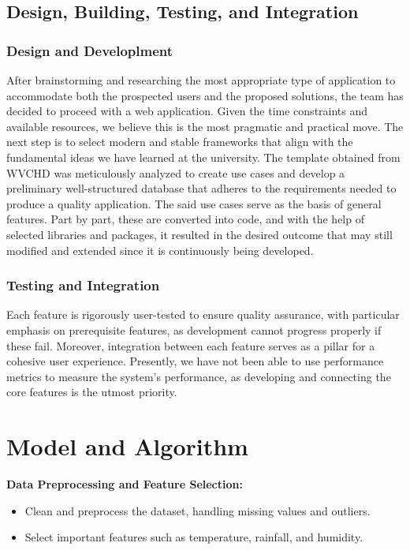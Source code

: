 \subsection{Design, Building, Testing, and Integration}
\subsubsection{Design and Developlment}
After brainstorming and researching the most appropriate type of application to accommodate both the prospected users and the proposed solutions, the team has decided to proceed with a web application. Given the time constraints and available resources, we believe this is the most pragmatic and practical move. The next step is to select modern and stable frameworks that align with the fundamental ideas we have learned at the university. The template obtained from WVCHD was meticulously analyzed to create use cases and develop a preliminary well-structured database that adheres to the requirements needed to produce a quality application. The said use cases serve as the basis of general features. Part by part, these are converted into code, and with the help of selected libraries and packages, it resulted in the desired outcome that may still modified and extended since it is continuously being developed. 

\subsubsection{Testing and Integration}
Each feature is rigorously user-tested to ensure quality assurance, with particular emphasis on prerequisite features, as development cannot progress properly if these fail. Moreover, integration between each feature serves as a pillar for a cohesive user experience. Presently, we have not been able to use performance metrics to measure the system's performance, as developing and connecting the core features is the utmost priority. 

\section{Model and Algorithm}
\textbf{Data Preprocessing and Feature Selection:}
\begin{itemize}
	\item Clean and preprocess the dataset, handling missing values and outliers.
	\item Select important features such as temperature, rainfall, and humidity.
\end{itemize}

